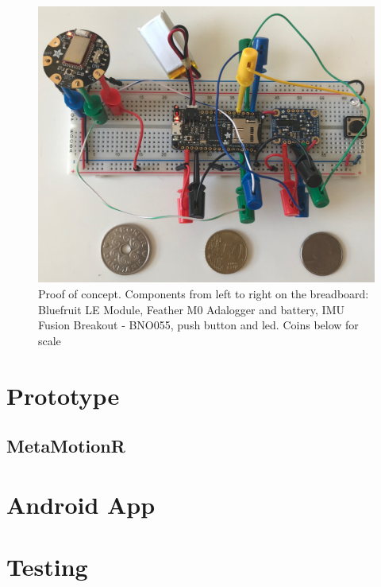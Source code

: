 \begin{figure}[h!]
    \centering
    \includegraphics[width=1\textwidth]{figures/poc.jpg}
    \caption{Proof of concept. Components from left to right on the breadboard: Bluefruit LE Module, Feather M0 Adalogger and battery, IMU Fusion Breakout - BNO055, push button and led. Coins below for scale}
    \label{poc}
\end{figure}


\section{Prototype}

\subsection{MetaMotionR}

\section{Android App}

\section{Testing}

